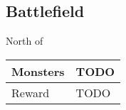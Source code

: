 \subsection{Battlefield}
\label{map:battlefield_11}

North of 

\noindent\begin{tabularx}{\textwidth}[l]{lX}
	Monsters
	& TODO
\\ \hline
	Reward & TODO
\end{tabularx}
